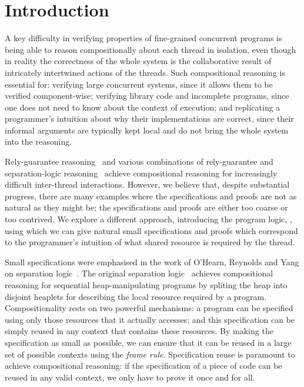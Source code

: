 \section{Introduction}
\label{sec:introduction}




A key difficulty in verifying properties of fine-grained concurrent
programs is being able to reason compositionally about each thread in
isolation, even though in reality the correctness of the whole system
is the collaborative result of intricately intertwined actions of the
threads.  Such compositional reasoning is essential for: verifying
large concurrent systems, since it allows them to be verified
component-wise;  verifying library code and incomplete programs,
since one does not need to know about the context of execution; and 
replicating a programmer's intuition about why their implementations
are correct, since their informal arguments are typically  kept local and do
not bring the whole system into the reasoning.


Rely-guarantee reasoning~\cite{rg} and various combinations of
rely-guarantee and separation-logic
reasoning~\cite{viktor-marriage,dg,lrg,cap-ecoop10,icap,tada} achieve
compositional reasoning for increasingly difficult inter-thread
interactions. However, we believe that, despite substantial progress, there are many
examples where the specifications and proofs are not as natural as
they might be; the specifications and proofs are either too coarse or
too 
contrived. 
We explore a different approach, introducing the
program logic, \colosl, using which we can give natural small
specifications and proofs which correspond to the  programmer's intuition of what shared
resource
is required by the thread. 




Small specifications were emphasised  in the work of O'Hearn, Reynolds
and Yang on separation logic~\cite{paperincludesYang}. 
The original separation logic~\cite{rey02,seplog} achieves
compositional reasoning for sequential heap-manipulating programs by
spliting the heap into disjoint heaplets for describing the local
resource required by a program. Compositionality rests on two
powerful mechanisms: a program  can be specified using only those
resources that it actually accesses; and this specification can be
simply reused in any context that contains these resources.
By making the specification
as small  as possible, we can ensure that it
can be reused in a large set of possible contexts using  the {\em frame
rule}. 
 Specification reuse is paramount to achieve compositional
reasoning: if the specification of a piece of code can be reused in
any valid context, we only have  to prove it once and for all. 


